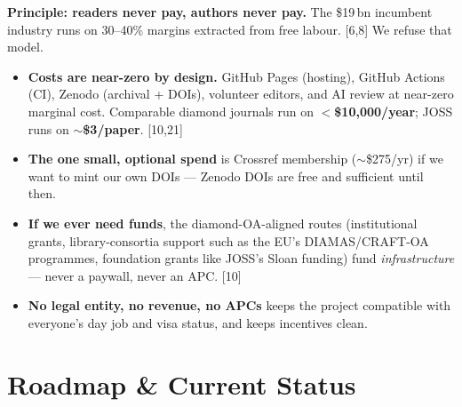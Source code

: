 \documentclass[11pt]{article}
\newcommand{\stat}[1]{{\sffamily\bfseries\color{accent}#1}}
\newcommand{\src}[1]{{\footnotesize\color{ink3}[#1]}}
\begin{document}
\begin{takeaway}
\textbf{Principle: readers never pay, authors never pay.} The \$19\,bn incumbent industry runs on 30--40\% margins extracted from free labour. \src{6,8} We refuse that model.
\end{takeaway}
\begin{itemize}
\item \textbf{Costs are near-zero by design.} GitHub Pages (hosting), GitHub Actions (CI), Zenodo (archival + DOIs), volunteer editors, and AI review at near-zero marginal cost. Comparable diamond journals run on \stat{$<$\$10{,}000/year}; JOSS runs on \stat{$\sim$\$3/paper}. \src{10,21}
\item \textbf{The one small, optional spend} is Crossref membership ($\sim$\$275/yr) if we want to mint our own DOIs --- Zenodo DOIs are free and sufficient until then.
\item \textbf{If we ever need funds}, the diamond-OA-aligned routes (institutional grants, library-consortia support such as the EU's DIAMAS/CRAFT-OA programmes, foundation grants like JOSS's Sloan funding) fund \emph{infrastructure} --- never a paywall, never an APC. \src{10}
\item \textbf{No legal entity, no revenue, no APCs} keeps the project compatible with everyone's day job and visa status, and keeps incentives clean.
\end{itemize}

\section{Roadmap \& Current Status}
\end{document}
